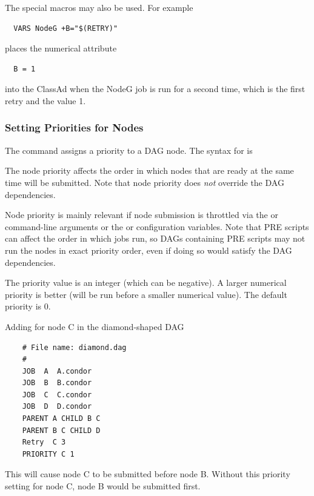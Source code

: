 The special macros may also be used.
For example
\begin{verbatim}
  VARS NodeG +B="$(RETRY)"
\end{verbatim}
places the numerical attribute
\begin{verbatim}
  B = 1
\end{verbatim}
into the ClassAd when the NodeG job is run for a second time,
which is the first retry and the value 1. 

\subsubsection{\label{sec:DAG-SetNodePriority}Setting Priorities for Nodes}

The  command assigns a priority to a DAG node.
The syntax for  is

  

The node priority affects the order in which nodes that are ready
at the same time will be submitted.  Note that node priority does
\emph{not} override the DAG dependencies.

Node priority is mainly relevant if
node submission is throttled via the  or 
command-line arguments or the  or
 configuration variables.  Note that PRE
scripts can affect the order in which jobs run, so DAGs containing
PRE scripts may not run the nodes in exact priority order, even if
doing so would satisfy the DAG dependencies.

The priority value is an integer (which can be negative).  A larger
numerical priority is better (will be run before a smaller numerical
value).  The default priority is 0.

Adding  for node C in the diamond-shaped
DAG
\footnotesize
\begin{verbatim}
    # File name: diamond.dag
    #
    JOB  A  A.condor 
    JOB  B  B.condor 
    JOB  C  C.condor	
    JOB  D  D.condor
    PARENT A CHILD B C
    PARENT B C CHILD D
    Retry  C 3
    PRIORITY C 1
\end{verbatim}
\normalsize

This will cause node C to be submitted before node B.
Without this priority setting for node C, node B would be submitted first.

